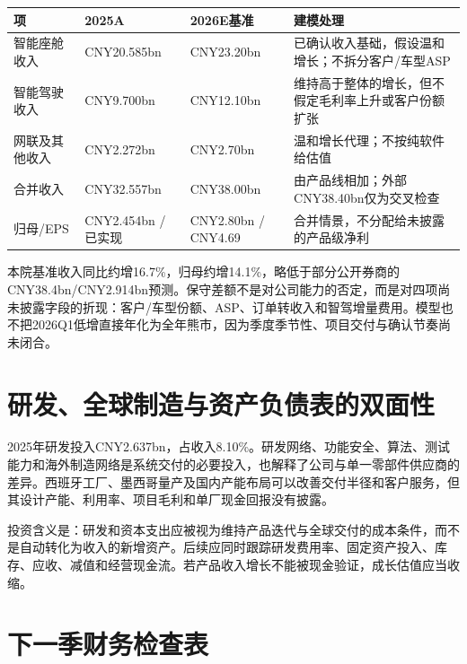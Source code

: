 \begin{exhibitbox}[从收入到EPS的合并口径桥]
\small
\begin{tabularx}{\textwidth}{L{2.5cm}Y Y Y}
\toprule
项 & 2025A & 2026E基准 & 建模处理 \\
\midrule
智能座舱收入 & CNY20.585bn & CNY23.20bn & 已确认收入基础，假设温和增长；不拆分客户/车型ASP \\
智能驾驶收入 & CNY9.700bn & CNY12.10bn & 维持高于整体的增长，但不假定毛利率上升或客户份额扩张 \\
网联及其他收入 & CNY2.272bn & CNY2.70bn & 温和增长代理；不按纯软件给估值 \\
合并收入 & CNY32.557bn & CNY38.00bn & 由产品线相加；外部CNY38.40bn仅为交叉检查 \\
归母/EPS & CNY2.454bn / 已实现 & CNY2.80bn / CNY4.69 & 合并情景，不分配给未披露的产品级净利 \\
\bottomrule
\end{tabularx}
\end{exhibitbox}

本院基准收入同比约增16.7\%，归母约增14.1\%，略低于部分公开券商的CNY38.4bn/CNY2.914bn预测。保守差额不是对公司能力的否定，而是对四项尚未披露字段的折现：客户/车型份额、ASP、订单转收入和智驾增量费用。模型也不把2026Q1低增直接年化为全年熊市，因为季度季节性、项目交付与确认节奏尚未闭合。

\section{研发、全球制造与资产负债表的双面性}

2025年研发投入CNY2.637bn，占收入8.10\%。研发网络、功能安全、算法、测试能力和海外制造网络是系统交付的必要投入，也解释了公司与单一零部件供应商的差异。西班牙工厂、墨西哥量产及国内产能布局可以改善交付半径和客户服务，但其设计产能、利用率、项目毛利和单厂现金回报没有披露。

投资含义是：研发和资本支出应被视为维持产品迭代与全球交付的成本条件，而不是自动转化为收入的新增资产。后续应同时跟踪研发费用率、固定资产投入、库存、应收、减值和经营现金流。若产品收入增长不能被现金验证，成长估值应当收缩。

\section{下一季财务检查表}

